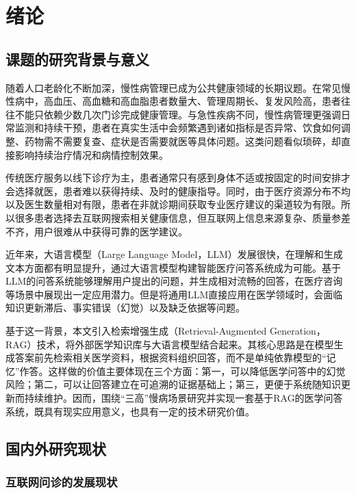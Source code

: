 \chapter{绪论}

\section{课题的研究背景与意义}

随着人口老龄化不断加深，慢性病管理已成为公共健康领域的长期议题。在常见慢性病中，高血压、高血糖和高血脂患者数量大、管理周期长、复发风险高，患者往往不能只依赖少数几次门诊完成健康管理。与急性疾病不同，慢性病管理更强调日常监测和持续干预，患者在真实生活中会频繁遇到诸如指标是否异常、饮食如何调整、药物需不需要复查、症状是否需要就医等具体问题\cite{ZWSG202601012}。这类问题看似琐碎，却直接影响持续治疗情况和病情控制效果。

传统医疗服务以线下诊疗为主，患者通常只有感到身体不适或按固定的时间安排才会选择就医，患者难以获得持续、及时的健康指导。同时，由于医疗资源分布不均以及医生数量相对有限，患者在非就诊期间获取专业医疗建议的渠道较为有限。所以很多患者选择去互联网搜索相关健康信息，但互联网上信息来源复杂、质量参差不齐，用户很难从中获得可靠的医学建议。

近年来，大语言模型（Large Language Model，LLM）发展很快，在理解和生成文本方面都有明显提升，通过大语言模型构建智能医疗问答系统成为可能。基于LLM的问答系统能够理解用户提出的问题，并生成相对流畅的回答，在医疗咨询等场景中展现出一定应用潜力。但是将通用LLM直接应用在医学领域时，会面临知识更新滞后、事实错误（幻觉）以及缺乏依据等问题\cite{YXQB202601003}。

基于这一背景，本文引入检索增强生成（Retrieval-Augmented Generation，RAG）技术，将外部医学知识库与大语言模型结合起来\cite{Ji_2023}。其核心思路是在模型生成答案前先检索相关医学资料，根据资料组织回答，而不是单纯依靠模型的“记忆”作答。这样做的价值主要体现在三个方面：第一，可以降低医学问答中的幻觉风险；第二，可以让回答建立在可追溯的证据基础上；第三，更便于系统随知识更新而持续维护。因而，围绕“三高”慢病场景研究并实现一套基于RAG的医学问答系统，既具有现实应用意义，也具有一定的技术研究价值。

\section{国内外研究现状}

\subsection{互联网问诊的发展现状}

